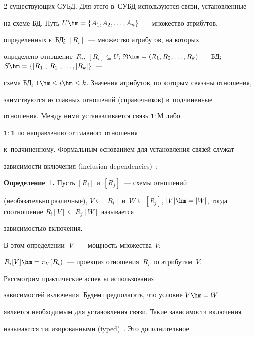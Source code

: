 \begin{multicols}{2}
существующих СУБД. Для этого в~СУБД используются связи, установленные

на схеме БД. Путь $U\hm= \{ A_1, A_2,\ldots , A_n\}$~--- множество атрибутов,

определенных в~БД; $[R_i]$~--- множество атрибутов, на которых

определено отношение~$R_i$, $[R_i]\subseteq U$; $\mathfrak{R}\hm= (R_1,

R_2, \ldots , R_k)$~--- БД; $S\hm= \{ [R_1], [R_2], \ldots , [R_k]\}$~---

схема БД, $1\hm\leq i\hm\leq k$. Значения атрибутов, по которым связаны отношения,

заимствуются из главных отношений (справочников) в~подчиненные

отношения. Между ними устанавливается связь $\mathbf{1}:\mathbf{М}$ либо

$\mathbf{1}:\mathbf{1}$ по направлению от главного отношения

к~подчиненному. Формальным основанием для установления связей служат

зависимости включения (inclusion dependencies)~\cite{5-z}:



  \smallskip



  \noindent

  \textbf{Определение~1.} Пусть $[R_i]$ и~$[R_j]$~--- схемы отношений 

  (необязательно различные), $V\subseteq [R_i]$ и~$W\subseteq [R_j]$, $\vert V\vert

\hm= \vert W\vert$, тогда соотношение $R_i[V]\subseteq R_j[W]$ называется

зависимостью включения.



  \smallskip



  В этом определении $\vert V\vert$~--- мощность множества~$V$;

$R_i[V]\hm= \pi_V(R_i)$~--- проекция отношения~$R_i$ по атрибутам~$V$.



Рассмотрим практические аспекты использования

зависимостей включения. Будем предполагать, что условие $V\hm= W$

является необходимым для установления связи. Такие зависимости включения

называются типизированными (typed)~\cite{6-z, 7-z}. Это дополнительное


\end{multicols}
